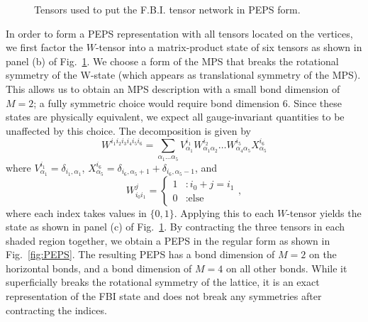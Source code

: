 \begin{figure}
	\centering
	\quad
\caption{ Tensors used to put the F.B.I. tensor network in PEPS form. }
\label{fig:FBI_PEPS_2}
\end{figure}

In order to form a PEPS representation with all tensors located on the
vertices, we first factor the $W$-tensor into a matrix-product state
of six tensors as shown in panel (b) of Fig.~\ref{fig:FBI_PEPS_2}. We
choose a form of the MPS that breaks the rotational symmetry
of the W-state (which appears as translational symmetry of the MPS).
This allows us to obtain an MPS description with a small bond dimension
of $M=2$; a fully symmetric choice would require bond dimension 6.
Since these states are physically equivalent, we expect all
gauge-invariant quantities to be unaffected by this choice.
The decomposition is given by
\begin{equation}
W^{i_1 i_2 i_3 i_4 i_5 i_6} = \sum\limits_{\alpha_1 \ldots \alpha_5} V^{i_1}_{\alpha_1} W^{i_2}_{\alpha_1 \alpha_2}
\ldots
W^{i_5}_{\alpha_4 \alpha_5} X^{i_6}_{\alpha_5}
\end{equation}
where $V^{i_1}_{\alpha_1} = \delta_{i_1, \alpha_1}$, $X^{i_6}_{\alpha_5} = \delta_{i_6,\alpha_5+1}+\delta_{i_6,\alpha_5-1}$, and
\begin{equation*}
W_{i_0 i_1}^{j}  = \left\{ \begin{array}{ll}
													1  &:  i_0+j=i_1 \\
													0  &:  \text{else}
													\end{array}
											\right.,
\end{equation*}
where each index takes values in $\{0, 1\}$. Applying this to each
$W$-tensor yields the state as shown in panel (c) of
Fig.~\ref{fig:FBI_PEPS_2}. By contracting the three tensors in each
shaded region together, we obtain a PEPS in the regular form as shown
in Fig.~\ref{fig:PEPS}. The resulting PEPS has a bond dimension of
$M=2$ on the horizontal bonds, and a bond dimension of $M=4$ on all
other bonds. While it superficially breaks
the rotational symmetry of the lattice, it is an exact representation
of the FBI state and does not break any symmetries after contracting
the indices.

